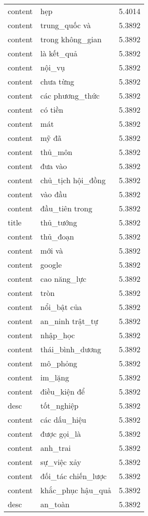 \documentclass{article}
\begin{document}
\begin{tabular}{lll}
content & hẹp & 5.4014\\
content & trung\_quốc và & 5.3892\\
content & trong không\_gian & 5.3892\\
content & là kết\_quả & 5.3892\\
content & nội\_vụ & 5.3892\\
content & chưa từng & 5.3892\\
content & các phương\_thức & 5.3892\\
content & có tiền & 5.3892\\
content & mát & 5.3892\\
content & mỹ đã & 5.3892\\
content & thủ\_môn & 5.3892\\
content & đưa vào & 5.3892\\
content & chủ\_tịch hội\_đồng & 5.3892\\
content & vào đầu & 5.3892\\
content & đầu\_tiên trong & 5.3892\\
title & thủ\_tướng & 5.3892\\
content & thủ\_đoạn & 5.3892\\
content & mới và & 5.3892\\
content & google & 5.3892\\
content & cao năng\_lực & 5.3892\\
content & tròn & 5.3892\\
content & nổi\_bật của & 5.3892\\
content & an\_ninh trật\_tự & 5.3892\\
content & nhập\_học & 5.3892\\
content & thái\_bình\_dương & 5.3892\\
content & mô\_phỏng & 5.3892\\
content & im\_lặng & 5.3892\\
content & điều\_kiện để & 5.3892\\
desc & tốt\_nghiệp & 5.3892\\
content & các dấu\_hiệu & 5.3892\\
content & được gọi\_là & 5.3892\\
content & anh\_trai & 5.3892\\
content & sự\_việc xảy & 5.3892\\
content & đối\_tác chiến\_lược & 5.3892\\
content & khắc\_phục hậu\_quả & 5.3892\\
desc & an\_toàn & 5.3892\\

\end{tabular}
\end{document}
